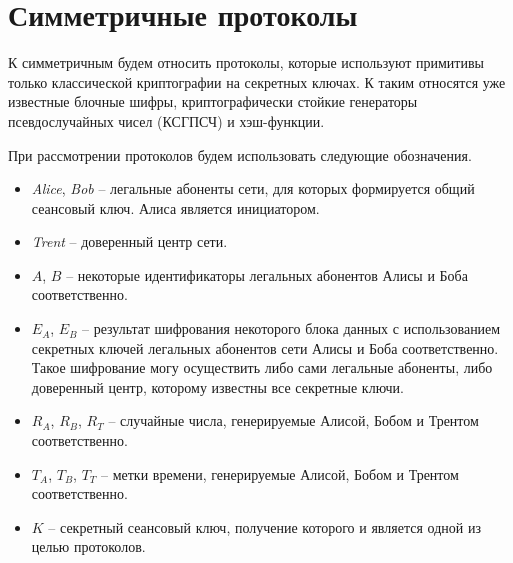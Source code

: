 \section{Симметричные протоколы}

К симметричным будем относить протоколы, которые используют примитивы только классической криптографии на секретных ключах. К таким относятся уже известные блочные шифры, криптографически стойкие генераторы псевдослучайных чисел (КСГПСЧ) и хэш-функции.

При рассмотрении протоколов будем использовать следующие обозначения.
\begin{itemize}
	\item \textit{Alice}, \textit{Bob} -- легальные абоненты сети, для которых формируется общий сеансовый ключ. Алиса является инициатором.
	\item \textit{Trent} -- доверенный центр сети.
	\item $A$, $B$ -- некоторые идентификаторы легальных абонентов Алисы и Боба соответственно.
	\item $E_A$, $E_B$ -- результат шифрования некоторого блока данных с использованием секретных ключей легальных абонентов сети Алисы и Боба соответственно. Такое шифрование могу осуществить либо сами легальные абоненты, либо доверенный центр, которому известны все секретные ключи.
	\item $R_A$, $R_B$, $R_T$ -- случайные числа, генерируемые Алисой, Бобом и Трентом соответственно.
	\item $T_A$, $T_B$, $T_T$ -- метки времени, генерируемые Алисой, Бобом и Трентом соответственно.
	\item $K$ -- секретный сеансовый ключ, получение которого и является одной из целью протоколов.
\end{itemize}






